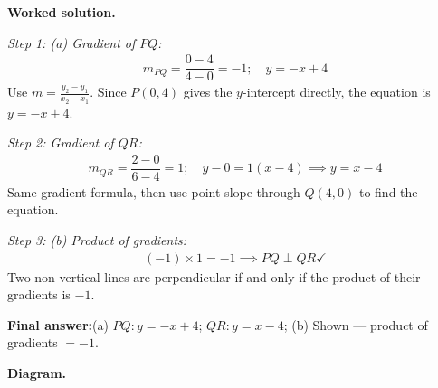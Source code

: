 \documentclass[11pt]{article}
\begin{document}
\textbf{Worked solution.}

\textit{Step 1: (a) Gradient of \( PQ \):}
\[\begin{gathered}
m_{PQ} = \dfrac{0 - 4}{4 - 0} = -1; \quad y = -x + 4
\end{gathered}\]
Use \( m = \frac{y_2 - y_1}{x_2 - x_1} \). Since \( P(0,4) \) gives the \( y \)-intercept directly, the equation is \( y = -x + 4 \).

\textit{Step 2: Gradient of \( QR \):}
\[\begin{gathered}
m_{QR} = \dfrac{2 - 0}{6 - 4} = 1; \quad y - 0 = 1(x - 4) \implies y = x - 4
\end{gathered}\]
Same gradient formula, then use point-slope through \( Q(4, 0) \) to find the equation.

\textit{Step 3: (b) Product of gradients:}
\[\begin{gathered}
(-1) \times 1 = -1 \implies PQ \perp QR \checkmark
\end{gathered}\]
Two non-vertical lines are perpendicular if and only if the product of their gradients is \( -1 \).

\begin{answerbox}
\textbf{Final answer:}\quad (a) \(\displaystyle PQ: y = -x + 4\); \(\displaystyle QR: y = x - 4\); (b) Shown --- product of gradients \(\displaystyle = -1\).
\end{answerbox}
\textbf{Diagram.}
\end{document}
